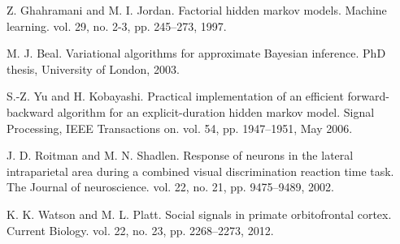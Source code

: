 \documentclass[10pt,letterpaper]{article}
\begin{document}
\begin{thebibliography}{10}
Z. Ghahramani and M. I. Jordan.
\newblock Factorial hidden markov models.
\newblock Machine learning. vol. 29, no. 2-3, pp. 245--273, 1997.

M. J. Beal.
\newblock Variational algorithms for approximate Bayesian inference.
\newblock PhD thesis, University of London, 2003.

S.-Z. Yu and H. Kobayashi.
\newblock Practical implementation of an efficient forward-backward algorithm for an explicit-duration hidden markov model.
\newblock Signal Processing, IEEE Transactions on. vol. 54, pp. 1947--1951, May 2006.

J. D. Roitman and M. N. Shadlen.
\newblock Response of neurons in the lateral intraparietal area during a combined visual discrimination reaction time
  task.
\newblock The Journal of neuroscience. vol. 22, no. 21, pp. 9475--9489,
  2002.

K. K. Watson and M. L. Platt.
\newblock Social signals in primate orbitofrontal cortex.
\newblock Current Biology. vol. 22, no. 23, pp. 2268--2273, 2012.

\end{thebibliography}
\end{document}
